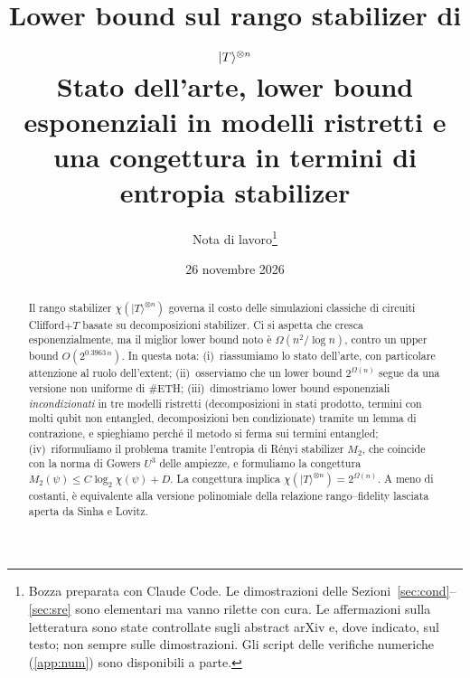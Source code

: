 \documentclass[11pt,a4paper]{article}
\title{\textbf{Lower bound sul rango stabilizer di $\ket{T}^{\otimes n}$}\\[4pt]
\large Stato dell'arte, lower bound esponenziali in modelli ristretti e una congettura in termini di entropia stabilizer}
\author{Nota di lavoro\thanks{Bozza preparata con Claude Code. Le dimostrazioni delle Sezioni~\ref{sec:cond}--\ref{sec:sre} sono elementari ma vanno rilette con cura. Le affermazioni sulla letteratura sono state controllate sugli abstract arXiv e, dove indicato, sul testo; non sempre sulle dimostrazioni. Gli script delle verifiche numeriche (\cref{app:num}) sono disponibili a parte.}}
\date{26 novembre 2026}
\theoremstyle{plain}
\theoremstyle{definition}
\theoremstyle{remark}
\newcommand{\ket}[1]{\lvert #1\rangle}
\newcommand{\Tst}{\ket{T}}
\begin{document}
\maketitle

\begin{abstract}
\noindent Il rango stabilizer $\chi(\Tst^{\otimes n})$ governa il costo delle simulazioni classiche di circuiti Clifford$+T$ basate su decomposizioni stabilizer. Ci si aspetta che cresca esponenzialmente, ma il miglior lower bound noto è $\Omega(n^2/\log n)$, contro un upper bound $O(2^{0.3963\,n})$. In questa nota:
(i)~riassumiamo lo stato dell'arte, con particolare attenzione al ruolo dell'extent;
(ii)~osserviamo che un lower bound $2^{\Omega(n)}$ segue da una versione non uniforme di \#ETH;
(iii)~dimostriamo lower bound esponenziali \emph{incondizionati} in tre modelli ristretti (decomposizioni in stati prodotto, termini con molti qubit non entangled, decomposizioni ben condizionate) tramite un lemma di contrazione, e spieghiamo perché il metodo si ferma sui termini entangled;
(iv)~riformuliamo il problema tramite l'entropia di Rényi stabilizer $M_2$, che coincide con la norma di Gowers $U^3$ delle ampiezze, e formuliamo la congettura $M_2(\psi)\le C\log_2\chi(\psi)+D$. La congettura implica $\chi(\Tst^{\otimes n})=2^{\Omega(n)}$. A meno di costanti, è equivalente alla versione polinomiale della relazione rango--fidelity lasciata aperta da Sinha e Lovitz.
\end{abstract}

\tableofcontents







\appendix


\end{document}
